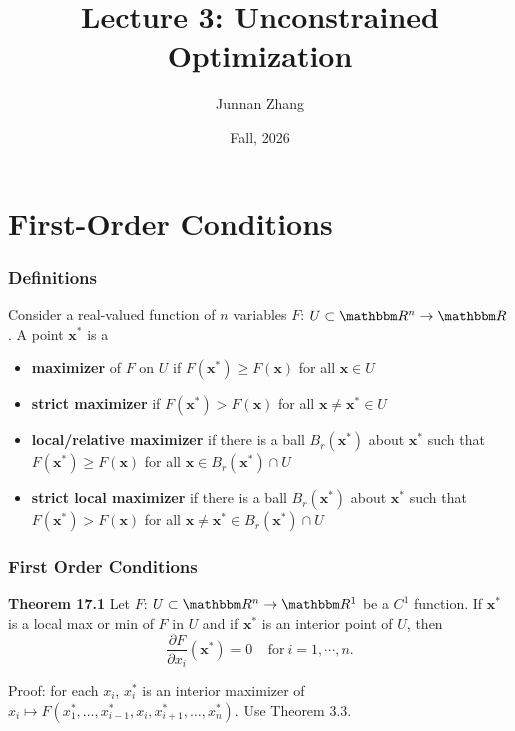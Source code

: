 \documentclass[9pt,aspectratio=169]{beamer}
\title[Lecture 3: Unconstrained Optimization]{Lecture 3: Unconstrained Optimization}
\author{Junnan Zhang} %
\institute[Paula and Gregory Chow Institute for Studies in Economics\\
Xiamen University] %
{
	Paula and Gregory Chow Institute for Studies in Economics \\ Xiamen University  \\ %
	\medskip
    \textit{Slides Prepared by Xiaoling Mei}
}
\date{Fall, 2026} %
\newcommand{\RR}{\mathbbm R}
\begin{document}
\begin{frame}
\titlepage %
\end{frame}

\section{First-Order Conditions}

\begin{frame}
\frametitle{Definitions}
Consider a real-valued function of $n$ variables $F$: $U\subset \RR^n
\rightarrow \RR$. A point $\mathbf{x}^*$ is a
\begin{itemize}
    \item \textbf{maximizer} of $F$ on $U$ if
    $F(\mathbf{x}^*)\geq F(\mathbf{x})$ for all $\mathbf{x} \in U$
    \item \textbf{strict maximizer} if $F(\mathbf{x}^*) > F(\mathbf{x})$ for
    all $\mathbf{x}\neq \mathbf{x}^* \in U$
    \item \textbf{local/relative maximizer} if there is a ball $B_r(\mathbf{x}^*)$
    about $\mathbf{x}^*$ such that $F(\mathbf{x}^*) \geq F(\mathbf{x})$ for
    all $\mathbf{x}\in B_r(\mathbf{x}^*)\cap U$
    \item \textbf{strict local maximizer} if there is a ball
    $B_r(\mathbf{x}^*)$ about $\mathbf{x}^*$ such that $F(\mathbf{x}^*) >
    F(\mathbf{x})$ for all $\mathbf{x} \neq \mathbf{x}^* \in
    B_r(\mathbf{x}^*)\cap U$
\end{itemize}
\end{frame}
		

\begin{frame}
	\frametitle{First Order Conditions}
	\begin{block}{\textbf{Theorem 17.1}}	
        Let $F$: $U\subset \RR^n \rightarrow \RR^1$ be a $C^1$ function. If
        $\mathbf{x}^*$ is a local max or min of $F$ in $U$ and if
        $\mathbf{x}^*$ is an interior point of $U$, then
        $$\frac{\partial F}{\partial x_i}(\mathbf{x}^*) = 0\ \ \ \ \ \text{for}\ i =
        1,\cdots, n. $$
	\end{block}
	Proof: for each $x_i$, $x_i^*$ is an interior maximizer of $x_i \mapsto
    F(x_1^*, \ldots, x_{i-1}^*, x_i, x_{i+1}^*, \ldots, x_n^*)$. Use Theorem 3.3.
\end{frame}	
\end{document}

